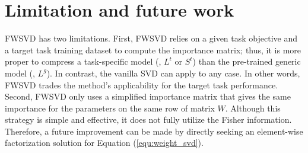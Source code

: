 \section{Limitation and future work}

FWSVD has two limitations. First, FWSVD relies on a given task objective and a target task training dataset to compute the importance matrix; thus, it is more proper to compress a task-specific model (\eg, $L^t$ or $S^t$) than the pre-trained generic model (\eg, $L^g$). In contrast, the vanilla SVD can apply to any case. In other words, FWSVD trades the method's applicability for the target task performance. Second, FWSVD only uses a simplified importance matrix that gives the same importance for the parameters on the same row of matrix $W$. Although this strategy is simple and effective, it does not fully utilize the Fisher information. Therefore, a future improvement can be made by directly seeking an element-wise factorization solution for Equation (\ref{equ:weight_svd}).